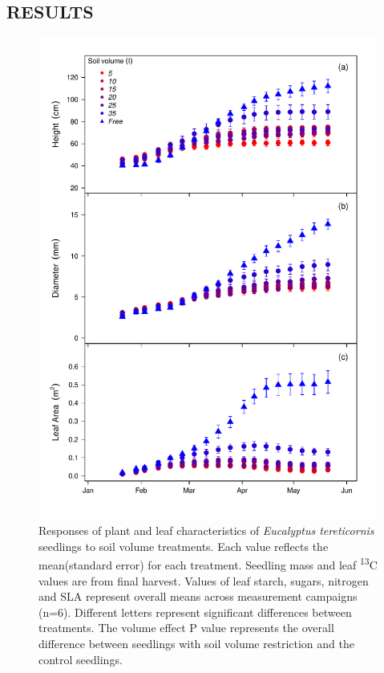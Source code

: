 \documentclass[a4paper]{article}\usepackage[]{graphicx}\usepackage[]{color}
\begin{document}
\subsection*{RESULTS}

\begin{figure}[h!]
    \centering
    \includegraphics[width=0.99\textwidth]{allometry.pdf}
    \caption{Responses of plant and leaf characteristics of \textit{Eucalyptus tereticornis} seedlings to soil volume treatments. Each value reflects the mean(standard error) for each treatment. Seedling mass and leaf {\textdelta}\textsuperscript{13}C values are from final harvest. Values of leaf starch, sugars, nitrogen and SLA represent overall means across measurement campaigns (n=6). Different letters represent significant differences between treatments. The volume effect P value represents the overall difference between seedlings with soil volume restriction and the control seedlings.}
    \label{fig:figure 2.1}
\end{figure}
\end{document}
